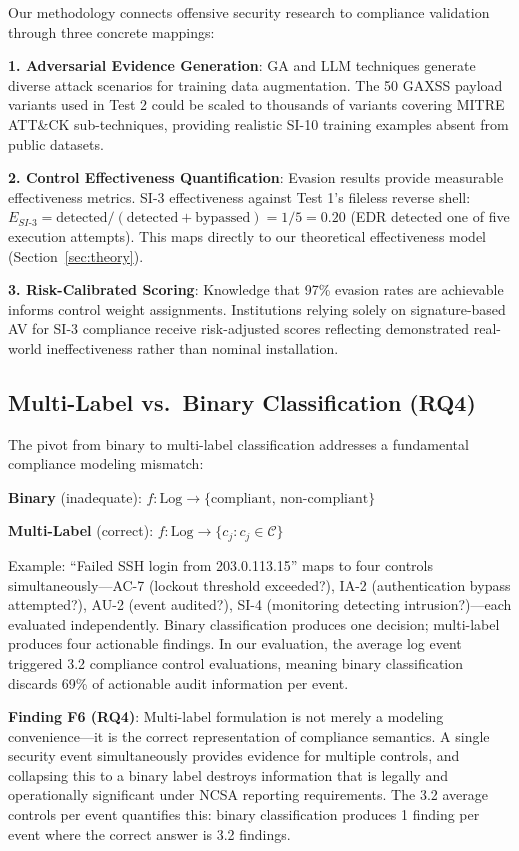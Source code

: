 \documentclass[11pt,conference]{IEEEtran}
\begin{document}
Our methodology connects offensive security research to compliance validation through three concrete mappings:

\textbf{1. Adversarial Evidence Generation}: GA and LLM techniques generate diverse attack scenarios for training data augmentation. The 50 GAXSS payload variants used in Test 2 could be scaled to thousands of variants covering MITRE ATT\&CK sub-techniques, providing realistic SI-10 training examples absent from public datasets.

\textbf{2. Control Effectiveness Quantification}: Evasion results provide measurable effectiveness metrics. SI-3 effectiveness against Test 1's fileless reverse shell: $E_{SI\text{-}3} = \text{detected} / (\text{detected} + \text{bypassed}) = 1/5 = 0.20$ (EDR detected one of five execution attempts). This maps directly to our theoretical effectiveness model (Section~\ref{sec:theory}).

\textbf{3. Risk-Calibrated Scoring}: Knowledge that 97\% evasion rates are achievable \cite{reverse_shell_paper} informs control weight assignments. Institutions relying solely on signature-based AV for SI-3 compliance receive risk-adjusted scores reflecting demonstrated real-world ineffectiveness rather than nominal installation.

\subsection{Multi-Label vs.\ Binary Classification (RQ4)}

The pivot from binary to multi-label classification addresses a fundamental compliance modeling mismatch:

\textbf{Binary} (inadequate): $f\colon \text{Log} \to \{\text{compliant},\, \text{non-compliant}\}$

\textbf{Multi-Label} (correct): $f\colon \text{Log} \to \{c_j : c_j \in \mathcal{C}\}$

Example: ``Failed SSH login from 203.0.113.15'' maps to four controls simultaneously---AC-7 (lockout threshold exceeded?), IA-2 (authentication bypass attempted?), AU-2 (event audited?), SI-4 (monitoring detecting intrusion?)---each evaluated independently. Binary classification produces one decision; multi-label produces four actionable findings. In our evaluation, the average log event triggered 3.2 compliance control evaluations, meaning binary classification discards 69\% of actionable audit information per event.

\textbf{Finding F6 (RQ4)}: Multi-label formulation is not merely a modeling convenience---it is the correct representation of compliance semantics. A single security event simultaneously provides evidence for multiple controls, and collapsing this to a binary label destroys information that is legally and operationally significant under NCSA reporting requirements. The 3.2 average controls per event quantifies this: binary classification produces 1 finding per event where the correct answer is 3.2 findings.
\end{document}
